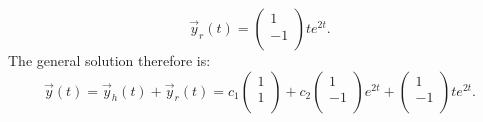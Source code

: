 \[ 
\Vec{y}_r(t) = \begin{pmatrix}
1\\
-1\\
\end{pmatrix} t e^{2t}
.\]
The general solution therefore is:
\[ 
\Vec{y}(t) = \Vec{y}_h(t) + \Vec{y}_r(t) = c_1 \begin{pmatrix}
1\\
1\\
\end{pmatrix} + c_2 \begin{pmatrix}
1\\
-1\\
\end{pmatrix} e^{2t} + \begin{pmatrix}
1\\
-1\\
\end{pmatrix} te^{2t}
.\]



